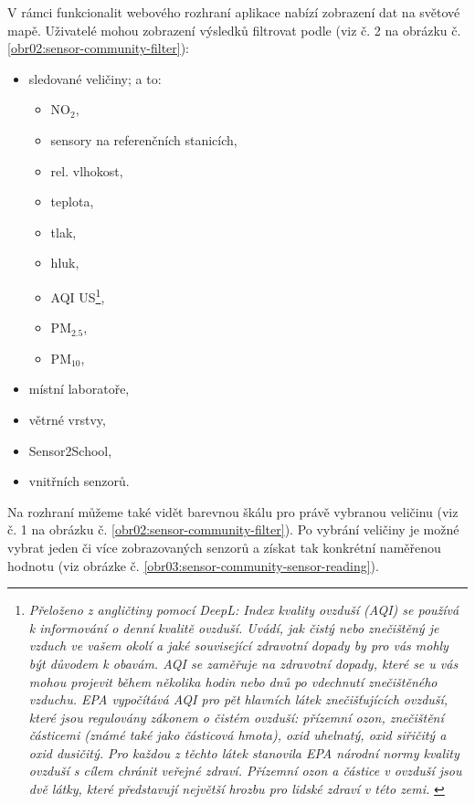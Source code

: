 V rámci funkcionalit webového rozhraní aplikace nabízí zobrazení dat na světové mapě. Uživatelé mohou zobrazení výsledků filtrovat podle (viz č. 2 na obrázku č. \ref{obr02:sensor-community-filter}):
\begin{itemize}
  \item sledované veličiny; a to:
    \begin{itemize}
      \item NO$_{2}$,
      \item sensory na referenčních stanicích,
      \item rel. vlhokost,
      \item teplota,
      \item tlak,
      \item hluk,
      \item AQI US\footnote{\textit{Přeloženo z angličtiny pomocí DeepL: Index kvality ovzduší (AQI) se používá k informování o denní kvalitě ovzduší. Uvádí, jak čistý nebo znečištěný je vzduch ve vašem okolí a jaké související zdravotní dopady by pro vás mohly být důvodem k obavám. AQI se zaměřuje na zdravotní dopady, které se u vás mohou projevit během několika hodin nebo dnů po vdechnutí znečištěného vzduchu. EPA vypočítává AQI pro pět hlavních látek znečišťujících ovzduší, které jsou regulovány zákonem o čistém ovzduší: přízemní ozon, znečištění částicemi (známé také jako částicová hmota), oxid uhelnatý, oxid siřičitý a oxid dusičitý. Pro každou z těchto látek stanovila EPA národní normy kvality ovzduší s cílem chránit veřejné zdraví. Přízemní ozon a částice v ovzduší jsou dvě látky, které představují největší hrozbu pro lidské zdraví v této zemi.} \parencite{usdepartmentofcommerceAirQualityIndex}},
      \item PM$_{2.5}$,
      \item PM$_{10}$,
    \end{itemize}
  \item místní laboratoře,
  \item větrné vrstvy,
  \item Sensor2School,
  \item vnitřních senzorů.
\end{itemize}

Na rozhraní můžeme také vidět barevnou škálu pro právě vybranou veličinu (viz č. 1 na obrázku č. \ref{obr02:sensor-community-filter}). Po vybrání veličiny je možné vybrat jeden či více zobrazovaných senzorů a získat tak konkrétní naměřenou hodnotu (viz obrázke č. \ref{obr03:sensor-community-sensor-reading}). 

